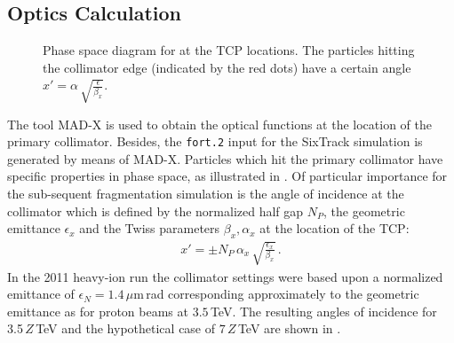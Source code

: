\subsection{Optics Calculation}
%
\begin{figure}[htpb]
  \centering
   \def\svgwidth{0.5\linewidth}
   
  \caption{Phase space diagram for at the TCP locations. The particles hitting the collimator edge (indicated by the red dots) have a certain angle $x'= \alpha \, \sqrt{ \frac{\epsilon}{\beta_x} }  $. }
  \label{pic:14070304}
\end{figure}
%
The tool MAD-X is used to obtain the optical functions at the location of the primary collimator. Besides, the \texttt{fort.2} input for the SixTrack simulation is generated by means of MAD-X. Particles which hit the primary collimator have specific properties in phase space, as illustrated in . Of particular importance for the sub-sequent fragmentation simulation is the angle of incidence at the collimator which is defined by the normalized half gap $N_P$, the geometric emittance $\epsilon_x$ and the Twiss parameters $\beta_x,\alpha_x$ at the location of the TCP:
\begin{align}
x' = \pm N_P \, \alpha_x \, \sqrt{\frac{\epsilon_x}{\beta_x}} \, . \label{eq:angle_of_incidence}
\end{align}
%
In the 2011 heavy-ion run the collimator settings were based upon a normalized emittance of \mbox{$\epsilon_N = 1.4\,\mu$m$\,$rad} corresponding approximately to the geometric emittance as for proton beams at $3.5\,$TeV.
%
The resulting angles of incidence for 3.5$\,Z\,$TeV and the hypothetical case of $7\,Z\,$TeV are shown in .
%
%

